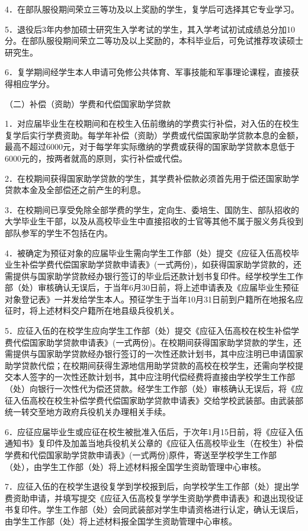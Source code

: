 \documentclass[UTF8,12pt,a4paper]{report}
\begin{document}
4．在部队服役期间荣立三等功及以上奖励的学生，复学后可选择其它专业学习。

5．退役后3年内参加硕士研究生入学考试的学生，其入学考试初试成绩总分加10分。在部队服役期间荣立二等功及以上奖励的，本科毕业后，可免试推荐攻读硕士研究生。

6．复学期间经学生本人申请可免修公共体育、军事技能和军事理论课程，直接获得相应学分。

（二）补偿（资助）学费和代偿国家助学贷款

1．对应届毕业生在校期间和在校生入伍前缴纳的学费实行补偿，对入伍的在校生复学后实行学费资助。每学年补偿（资助）学费或代偿国家助学贷款本息的金额，最高不超过6000元，对于每学年实际缴纳的学费或获得的国家助学贷款本息低于6000元的，按两者就高的原则，实行补偿或代偿。

2．在校期间获得国家助学贷款的学生，其学费补偿款必须首先用于偿还国家助学贷款本金及全部偿还之前产生的利息。

3．在校期间已享受免除全部学费的学生，定向生、委培生、国防生、部队招收的大学毕业生干部，以及从高校毕业生中直接招收的士官等其他不属于服义务兵役到部队参军的学生不包括在内。

4．被确定为预征对象的应届毕业生需向学生工作部（处）提交《应征入伍高校毕业生补偿学费代偿国家助学贷款申请表》(一式两份)，如获得国家助学贷款的，还需提供与国家助学贷款经办银行签订的毕业后还款计划书复印件。经学校学生工作部（处）审核确认无误后，于当年6月30日前，将上述申请表及《应届毕业生预征对象登记表》一并发给学生本人。预征学生于当年10月31日前到户籍所在地报名应征时，将上述材料交户籍所在地县级兵役机关。

5．应征入伍的在校学生应向学生工作部（处）提交《应征入伍高校在校生补偿学费代偿国家助学贷款申请表》(一式两份)。在校期间获得国家助学贷款的学生，还需提供与国家助学贷款经办银行签订的一次性还款计划书，其中应注明已申请国家助学贷款代偿；在校期间获得生源地信用助学贷款的高校在校学生，还需向学校提交本人签字的一次性还款计划书，其中应注明代偿经费将直接由学校学生工作部（处）向银行一次性代为偿还贷款。经学生工作部（处）审核确认无误后，将《应征入伍高校在校生补偿学费代偿国家助学贷款申请表》交给学校武装部。由武装部统一转交至地方政府兵役机关办理相关手续。

6．应征应届毕业生或应征在校生被批准入伍后，于次年1月15日前，将《应征入伍通知书》复印件及加盖当地兵役机关公章的《应征入伍高校毕业生（在校生）补偿学费和代偿国家助学贷款申请表》(一式两份)原件，寄送至学校学生工作部（处），由学生工作部（处）将上述材料报全国学生资助管理中心审核。

7．应征入伍的在校学生退役复学到学校报到后，向学校学生工作部（处）提出学费资助申请，并填写提交《应征入伍高校复学学生资助学费申请表》和退出现役证书复印件。学生工作部（处）会同武装部对学生申请资格进行认定，确认无误后，由学生工作部（处）将上述材料报全国学生资助管理中心审核。
\end{document}
